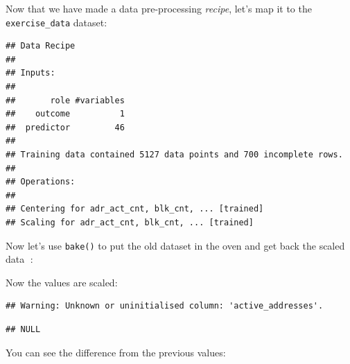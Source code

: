 \documentclass[
]{book}
\newenvironment{Shaded}{\begin{snugshade}}{\end{snugshade}}
\newcommand{\DecValTok}[1]{\textcolor[rgb]{0.00,0.00,0.81}{#1}}
\newcommand{\KeywordTok}[1]{\textcolor[rgb]{0.13,0.29,0.53}{\textbf{#1}}}
\newcommand{\NormalTok}[1]{#1}
\newcommand{\OperatorTok}[1]{\textcolor[rgb]{0.81,0.36,0.00}{\textbf{#1}}}
\newcommand{\StringTok}[1]{\textcolor[rgb]{0.31,0.60,0.02}{#1}}
\begin{document}
Now that we have made a data pre-processing \emph{recipe}, let's map it to the \texttt{exercise\_data} dataset:

\begin{Shaded}
\end{Shaded}

\begin{verbatim}
## Data Recipe
## 
## Inputs:
## 
##       role #variables
##    outcome          1
##  predictor         46
## 
## Training data contained 5127 data points and 700 incomplete rows. 
## 
## Operations:
## 
## Centering for adr_act_cnt, blk_cnt, ... [trained]
## Scaling for adr_act_cnt, blk_cnt, ... [trained]
\end{verbatim}

Now let's use \texttt{bake()} to put the old dataset in the oven and get back the scaled data 🍰:

\begin{Shaded}
\end{Shaded}

Now the values are scaled:

\begin{Shaded}
\end{Shaded}

\begin{verbatim}
## Warning: Unknown or uninitialised column: 'active_addresses'.
\end{verbatim}

\begin{verbatim}
## NULL
\end{verbatim}

You can see the difference from the previous values:

\begin{Shaded}
\end{Shaded}
\end{document}
